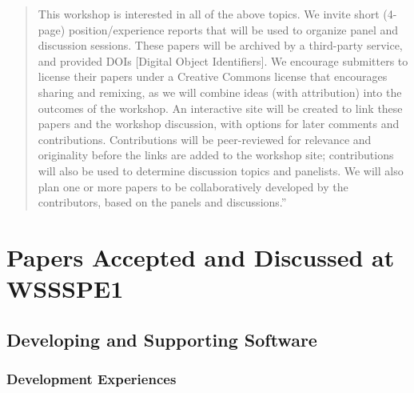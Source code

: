 \documentclass[11pt, oneside]{amsart}
\begin{document}
\begin{quote}
This workshop is interested in all of the above topics.  We invite
short (4-page) position/experience reports that will be used to
organize panel and discussion sessions. These papers will be archived
by a third-party service, and provided DOIs [Digital Object
  Identifiers].  We encourage submitters to license their papers under
a Creative Commons license that encourages sharing and remixing, as we
will combine ideas (with attribution) into the outcomes of the
workshop.  An interactive site will be created to link these papers
and the workshop discussion, with options for later comments and
contributions. Contributions will be peer-reviewed for relevance and
originality before the links are added to the workshop site;
contributions will also be used to determine discussion topics and
panelists. We will also plan one or more papers to be collaboratively
developed by the contributors, based on the panels and discussions.''
\end{quote}

\section{Papers Accepted and Discussed at WSSSPE1} \label{sec:papers}

\subsection*{Developing and Supporting Software}

\subsubsection*{Development Experiences}
\end{document}
